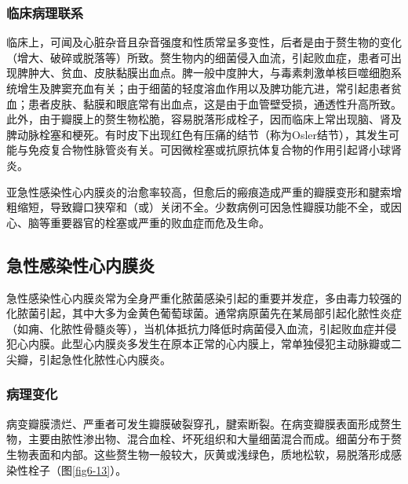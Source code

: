 \subsubsection{临床病理联系}

临床上，可闻及心脏杂音且杂音强度和性质常呈多变性，后者是由于赘生物的变化（增大、破碎或脱落等）所致。赘生物内的细菌侵入血流，引起败血症，患者可出现脾肿大、贫血、皮肤黏膜出血点。脾一般中度肿大，与毒素刺激单核巨噬细胞系统增生及脾窦充血有关；由于细菌的轻度溶血作用以及脾功能亢进，常引起患者贫血；患者皮肤、黏膜和眼底常有出血点，这是由于血管壁受损，通透性升高所致。此外，由于瓣膜上的赘生物松脆，容易脱落形成栓子，因而临床上常出现脑、肾及脾动脉栓塞和梗死。有时皮下出现红色有压痛的结节（称为Osler结节），其发生可能与免疫复合物性脉管炎有关。可因微栓塞或抗原抗体复合物的作用引起肾小球肾炎。

亚急性感染性心内膜炎的治愈率较高，但愈后的瘢痕造成严重的瓣膜变形和腱索增粗缩短，导致瓣口狭窄和（或）关闭不全。少数病例可因急性瓣膜功能不全，或因心、脑等重要器官的栓塞或严重的败血症而危及生命。

\subsection{急性感染性心内膜炎}

急性感染性心内膜炎常为全身严重化脓菌感染引起的重要并发症，多由毒力较强的化脓菌引起，其中大多为金黄色葡萄球菌。通常病原菌先在某局部引起化脓性炎症（如痈、化脓性骨髓炎等），当机体抵抗力降低时病菌侵入血流，引起败血症并侵犯心内膜。此型心内膜炎多发生在原本正常的心内膜上，常单独侵犯主动脉瓣或二尖瓣，引起急性化脓性心内膜炎。

\subsubsection{病理变化}

病变瓣膜溃烂、严重者可发生瓣膜破裂穿孔，腱索断裂。在病变瓣膜表面形成赘生物，主要由脓性渗出物、混合血栓、坏死组织和大量细菌混合而成。细菌分布于赘生物表面和内部。这些赘生物一般较大，灰黄或浅绿色，质地松软，易脱落形成感染性栓子（图\ref{fig6-13}）。

